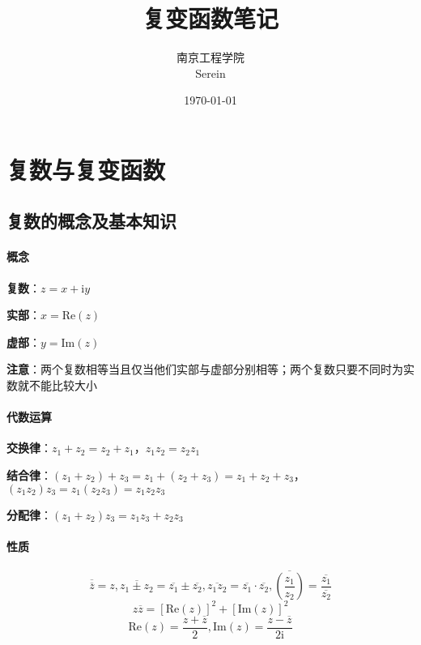 \documentclass[12pt, a4paper, twoside]{ctexbook}
\title{{\Huge{\textbf{复变函数笔记}}}}
\author{南京工程学院\\Serein}
\date{\today}
\begin{document}
\maketitle

\setcounter{page}{1}

\newpage
{}
\setcounter{page}{1}
\tableofcontents
\newpage
\setcounter{page}{1}

\chapter{复数与复变函数}
\newpage

\section{复数的概念及基本知识}
\subsubsection*{概念}
\textbf{复数}：$z=x+\mathrm{i}y$

\textbf{实部}：$x=\mathrm{Re}\left(z\right)$

\textbf{虚部}：$y=\mathrm{Im}\left(z\right)$

\textbf{注意}：两个复数相等当且仅当他们实部与虚部分别相等；两个复数只要不同时为实数就不能比较大小

\subsubsection*{代数运算}
\textbf{交换律}：$z_1+z_2=z_2+z_1$，$z_1z_2=z_2z_1$

\textbf{结合律}：$\left(z_1+z_2\right)+z_3=z_1+\left(z_2+z_3\right)=z_1+z_2+z_3$，$\left(z_1z_2\right)z_3=z_1\left(z_2z_3\right)=z_1z_2z_3$

\textbf{分配律}：$\left(z_1+z_2\right)z_3=z_1z_3+z_2z_3$

\subsubsection*{性质}
$$
\overline{\overline{z}}=z,\overline{z_1\pm z_2}=\overline{z_1}\pm\overline{z_2},\overline{z_1z_2}=\overline{z_1}\cdot \overline{z_2},\overline{\left(\frac{z_1}{z_2}\right)}=\frac{\overline{z_1}}{\overline{z_2}}
$$
$$
z\overline{z}=\left[\mathrm{Re}\left(z\right)\right]^2+\left[\mathrm{Im}\left(z\right)\right]^2
$$
$$
\mathrm{Re}\left(z\right)=\frac{z+\overline{z}}{2},\mathrm{Im}\left(z\right)=\frac{z-\overline{z}}{2\mathrm{i}}
$$
\end{document}
